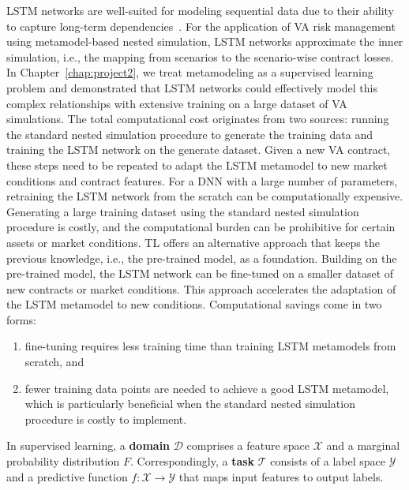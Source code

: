 LSTM networks are well-suited for modeling sequential data due to their ability to capture long-term dependencies~\citep{hochreiter1997long}.
For the application of VA risk management using metamodel-based nested simulation, LSTM networks approximate the inner simulation, i.e., the mapping from scenarios to the scenario-wise contract losses.
In Chapter~\ref{chap:project2}, we treat metamodeling as a supervised learning problem and demonstrated that LSTM networks could effectively model this complex relationships with extensive training on a large dataset of VA simulations.
The total computational cost originates from two sources: running the standard nested simulation procedure to generate the training data and training the LSTM network on the generate dataset.
Given a new VA contract, these steps need to be repeated to adapt the LSTM metamodel to new market conditions and contract features.
For a DNN with a large number of parameters, retraining the LSTM network from the scratch can be computationally expensive.
Generating a large training dataset using the standard nested simulation procedure is costly, and the computational burden can be prohibitive for certain assets or market conditions.
TL offers an alternative approach that keeps the previous knowledge, i.e., the pre-trained model, as a foundation.
Building on the pre-trained model, the LSTM network can be fine-tuned on a smaller dataset of new contracts or market conditions.
This approach accelerates the adaptation of the LSTM metamodel to new conditions.
Computational savings come in two forms: 
\begin{enumerate}
    \item   fine-tuning requires less training time than training LSTM metamodels from scratch, and
    \item   fewer training data points are needed to achieve a good LSTM metamodel, which is particularly beneficial when the standard nested simulation procedure is costly to implement.
\end{enumerate}

In supervised learning, a \textbf{domain} $\mathcal{D}$ comprises a feature space $\mathcal{X}$ and a marginal probability distribution $F$. Correspondingly, a \textbf{task} $\mathcal{T}$ consists of a label space $\mathcal{Y}$ and a predictive function $f: \mathcal{X} \rightarrow \mathcal{Y}$ that maps input features to output labels.


